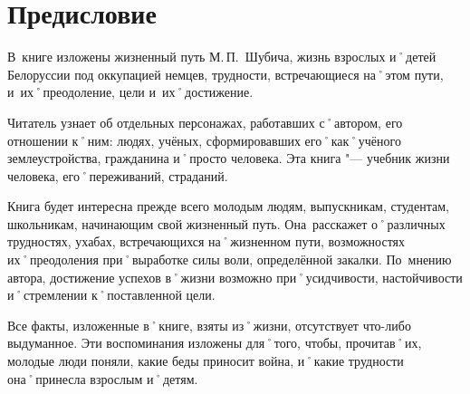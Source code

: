 ﻿\chapter{Предисловие}
В~книге изложены жизненный путь М.\,П.~Шубича, жизнь взрослых и˚детей Белоруссии под оккупацией немцев, трудности, встречающиеся на˚этом пути, и~их˚преодоление, цели и~их˚достижение.

Читатель узнает об отдельных персонажах, работавших с˚автором, его отношении к˚ним: людях, учёных, сформировавших его˚как˚учёного землеустройства, гражданина и˚просто человека. Эта книга "--- учебник жизни человека, его˚переживаний, страданий.

Книга будет интересна прежде всего молодым людям, выпускникам, студентам, школьникам, начинающим свой жизненный путь. Она~расскажет о˚различных трудностях, ухабах, встречающихся на˚жизненном пути, возможностях их˚преодоления при˚выработке силы воли, определённой закалки. По~мнению автора, достижение успехов в˚жизни возможно при˚усидчивости, настойчивости и˚стремлении к˚поставленной цели.

Все факты, изложенные в˚книге, взяты из˚жизни, отсутствует что-либо выдуманное. Эти воспоминания изложены для˚того, чтобы, прочитав˚их, молодые люди поняли, какие беды приносит война, и˚какие трудности она˚принесла взрослым и˚детям.